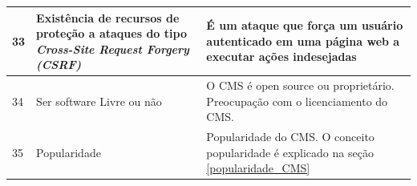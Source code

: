 \begin{apendicesenv}
\begin{landscape}
\begin{longtable}{|p{10pt}|p{220pt}|p{415pt}|}
 	 	\hline
 	{\raggedright {33}}
 	 	 & {\raggedright {Existência de recursos de proteção a ataques do tipo \textit{Cross-Site Request Forgery (CSRF)}}}
 	 	 & {\raggedright {É um ataque que força um usuário autenticado em uma página web a  executar ações indesejadas \cite{Owasp} }}\\
 	 	\hline
 	 	{\raggedright {34}}
 	 	 	 	 & {\raggedright {Ser software Livre ou não}}
 	 	 	 	 & {\raggedright {O CMS é open source ou proprietário. Preocupação com o licenciamento do CMS. \cite{Cheng2012}}}\\
 	 	 	 	\hline
 	 {\raggedright {35}}
 	  	 	 	 	 & {\raggedright {Popularidade}}
 	  	 	 	 	 & {\raggedright {Popularidade do CMS. O conceito popularidade é explicado na seção \ref{popularidade_CMS}}}\\
 	  	 	 	 	\hline
 	  	 	 	 	

\end{longtable}
\end{landscape}
\end{apendicesenv}
